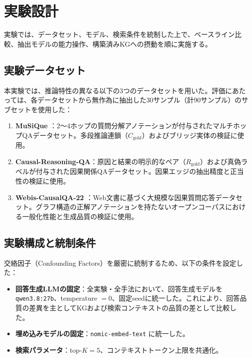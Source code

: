 \documentclass[a4j,dvipdfmx]{jsarticle}
\begin{document}
\section{実験設計}

実験では、データセット、モデル、検索条件を統制した上で、ベースライン比較、抽出モデルの能力操作、構築済みKGへの摂動を順に実施する。

\subsection{実験データセット}
本実験では、推論特性の異なる以下の3つのデータセットを用いた。評価にあたっては、各データセットから無作為に抽出した30サンプル（計90サンプル）のサブセットを使用した：
\begin{enumerate}
    \item \textbf{MuSiQue} \cite{trivedi2022musique}：2〜4ホップの質問分解アノテーションが付与されたマルチホップQAデータセット。多段推論連鎖（$C_{\text{gold}}$）およびブリッジ実体の検証に使用。
    \item \textbf{Causal-Reasoning-QA}：原因と結果の明示的なペア（$R_{\text{gold}}$）および真偽ラベルが付与された因果関係QAデータセット。因果エッジの抽出精度と正当性の検証に使用。
    \item \textbf{Webis-CausalQA-22} \cite{bondarenko2022causalqa}：Web文書に基づく大規模な因果質問応答データセット。グラフ構造の正解アノテーションを持たないオープンコーパスにおける一般化性能と生成品質の検証に使用。
\end{enumerate}

\subsection{実験構成と統制条件}
交絡因子（Confounding Factors）を厳密に統制するため、以下の条件を設定した：
\begin{itemize}
    \item \textbf{回答生成LLMの固定}：全実験・全手法において、回答生成モデルを \texttt{qwen3.8:27b}、temperature $=0$、固定seedに統一した。これにより、回答品質の差異を主としてKGおよび検索コンテキストの品質の差として比較した。
    \item \textbf{埋め込みモデルの固定}：\texttt{nomic-embed-text} に統一した。
    \item \textbf{検索パラメータ}：top-$K = 5$、コンテキストトークン上限を共通化。
\end{itemize}
\end{document}
